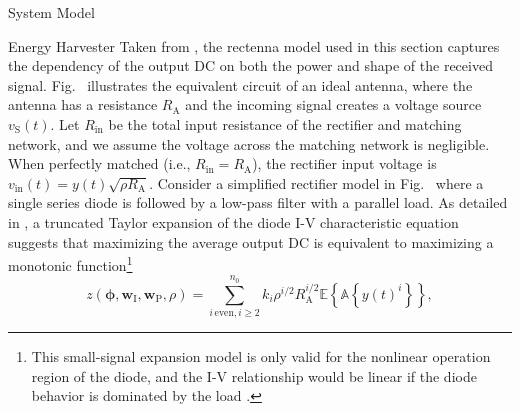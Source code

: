 \documentclass[journal]{IEEEtran}
\begin{document}
\begin{section}{System Model}
\begin{subsection}{Energy Harvester}
			Taken from \cite{Clerckx2016a}, the rectenna model used in this section captures the dependency of the output DC on both the power and shape of the received signal. Fig.~ illustrates the equivalent circuit of an ideal antenna, where the antenna has a resistance $R_{\mathrm{A}}$ and the incoming signal creates a voltage source $v_{\mathrm{S}}(t)$. Let $R_{\mathrm{in}}$ be the total input resistance of the rectifier and matching network, and we assume the voltage across the matching network is negligible. When perfectly matched (i.e., $R_{\mathrm{in}}=R_{\mathrm{A}}$), the rectifier input voltage is $v_{\mathrm{in}}(t)=y(t)\sqrt{\rho R_{\mathrm{A}}}$. Consider a simplified rectifier model in Fig.~ where a single series diode is followed by a low-pass filter with a parallel load. As detailed in \cite{Clerckx2018b}, a truncated Taylor expansion of the diode I-V characteristic equation suggests that maximizing the average output DC is equivalent to maximizing a monotonic function\footnote{This small-signal expansion model is only valid for the nonlinear operation region of the diode, and the I-V relationship would be linear if the diode behavior is dominated by the load \cite{Clerckx2016a}.}
			\begin{equation}\label{eq:z}
				z(\boldsymbol{\phi},\boldsymbol{w}_{\mathrm{I}},\boldsymbol{w}_{\mathrm{P}},\rho)=\sum_{i\,\mathrm{even},i\ge2}^{n_0}{k_i}{\rho^{i/2}}{R_{\mathrm{A}}^{i/2}}{\mathbb{E}\left\{\mathbb{A}\left\{y(t)^i\right\}\right\}},
			\end{equation}

\end{subsection}
\end{section}
\end{document}
